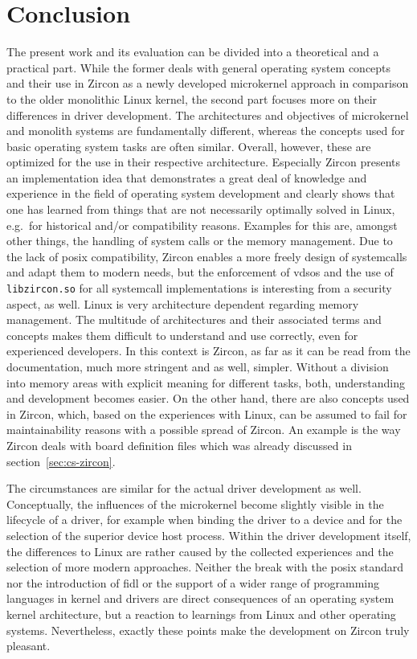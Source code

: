 
\chapter{Conclusion}\label{ch:conclusion}
The present work and its evaluation can be divided into a theoretical and a practical part.
While the former deals with general operating system concepts and their use in Zircon as a newly developed microkernel approach in comparison to the older monolithic Linux kernel, the second part focuses more on their differences in driver development.
The architectures and objectives of microkernel and monolith systems are fundamentally different, whereas the concepts used for basic operating system tasks are often similar.
Overall, however, these are optimized for the use in their respective architecture.
Especially Zircon presents an implementation idea that demonstrates a great deal of knowledge and experience in the field of operating system development and clearly shows that one has learned from things that are not necessarily optimally solved in Linux, e.g.\ for historical and/or compatibility reasons.
Examples for this are, amongst other things, the handling of system calls or the memory management.
Due to the lack of \ac{posix} compatibility, Zircon enables a more freely design of systemcalls and adapt them to modern needs, but the enforcement of \acp{vdso} and the use of \texttt{libzircon.so} for all systemcall implementations is interesting from a security aspect, as well.
Linux is very architecture dependent regarding memory management.
The multitude of architectures and their associated terms and concepts makes them difficult to understand and use correctly, even for experienced developers.
In this context is Zircon, as far as it can be read from the documentation, much more stringent and as well, simpler.
Without a division into memory areas with explicit meaning for different tasks, both, understanding and development becomes easier.
On the other hand, there are also concepts used in Zircon, which, based on the experiences with Linux, can be assumed to fail for maintainability reasons with a possible spread of Zircon.
An example is the way Zircon deals with board definition files which was already discussed in section~\ref{sec:cs-zircon}.

The circumstances are similar for the actual driver development as well.
Conceptually, the influences of the microkernel become slightly visible in the lifecycle of a driver, for example when binding the driver to a device and for the selection of the superior device host process.
Within the driver development itself, the differences to Linux are rather caused by the collected experiences and the selection of more modern approaches.
Neither the break with the \ac{posix} standard nor the introduction of \ac{fidl} or the support of a wider range of programming languages in kernel and drivers are direct consequences of an operating system kernel architecture, but a reaction to learnings from Linux and other operating systems.
Nevertheless, exactly these points make the development on Zircon truly pleasant.

